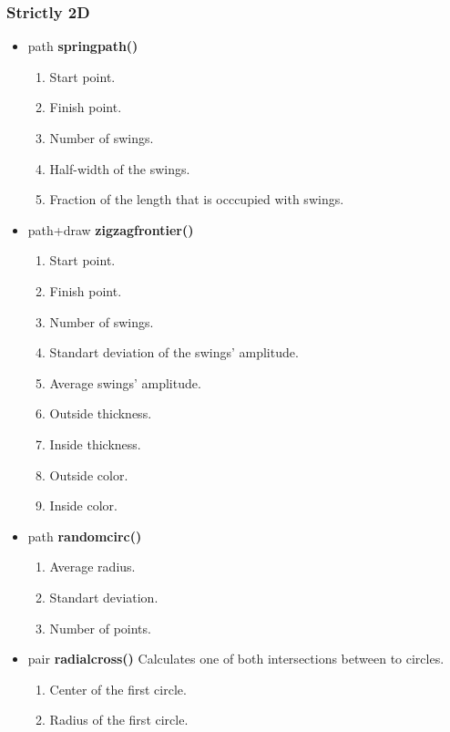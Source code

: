 \subsubsection{Strictly 2D}
\begin{itemize}
\item path {\bfseries springpath()}
  \begin{enumerate}
  \item {} Start point.
  \item {} Finish point.
  \item {} Number of swings.
  \item {} Half-width of the swings.
  \item {} Fraction of the length that is occcupied with swings.
  \end{enumerate}
\item path+draw {\bfseries zigzagfrontier()}
  \begin{enumerate}
  \item {} Start point.
  \item {} Finish point.
  \item {} Number of swings.
  \item {} Standart deviation of the swings' amplitude.
  \item {} Average swings' amplitude.
  \item {} Outside thickness.
  \item {} Inside thickness.
  \item {} Outside color.
  \item {} Inside color.
  \end{enumerate}
\item path {\bfseries randomcirc()}
  \begin{enumerate}
  \item {} Average radius. 
  \item {} Standart deviation.
  \item {} Number of points.
  \end{enumerate}
\item pair {\bfseries radialcross()} Calculates one of both
  intersections between to circles.
  \begin{enumerate}
  \item {} Center of the first circle. 
  \item {} Radius of the first circle.

\end{enumerate}
\end{itemize}
